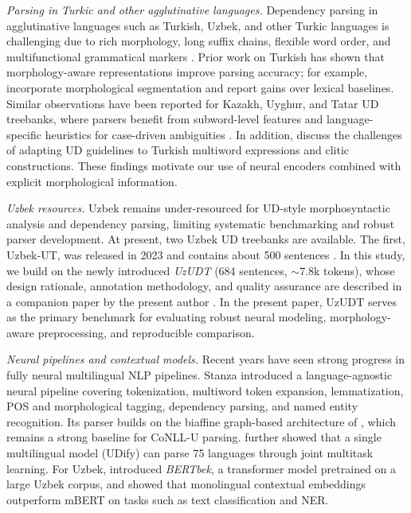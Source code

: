 \documentclass[runningheads]{llncs}
\begin{document}
\noindent\textit{Parsing in Turkic and other agglutinative languages.}
Dependency parsing in agglutinative languages such as Turkish, Uzbek, and other Turkic languages is challenging due to rich morphology, long suffix chains, flexible word order, and multifunctional grammatical markers \cite{MURZINTCEV2026100195}. Prior work on Turkish has shown that morphology-aware representations improve parsing accuracy; for example, \cite{eryigit-etal-2008-dependency} incorporate morphological segmentation and report gains over lexical baselines. Similar observations have been reported for Kazakh, Uyghur, and Tatar UD treebanks, where parsers benefit from subword-level features and language-specific heuristics for case-driven ambiguities \cite{Marsan_undated-hp}. In addition, \cite{noauthor_2018-qq} discuss the challenges of adapting UD guidelines to Turkish multiword expressions and clitic constructions. These findings motivate our use of neural encoders combined with explicit morphological information.

\noindent\textit{Uzbek resources.}
Uzbek remains under-resourced for UD-style morphosyntactic analysis and dependency parsing, limiting systematic benchmarking and robust parser development. At present, two Uzbek UD treebanks are available. The first, Uzbek-UT, was released in 2023 and contains about 500 sentences \cite{akhundjanova-talamo-2025-universal}. In this study, we build on the newly introduced \emph{UzUDT} (684 sentences, ${\sim}$7.8k tokens), whose design rationale, annotation methodology, and quality assurance are described in a companion paper by the present author \cite{matlatipov2025goldudt}. In the present paper, UzUDT serves as the primary benchmark for evaluating robust neural modeling, morphology-aware preprocessing, and reproducible comparison.

\noindent\textit{Neural pipelines and contextual models.}
Recent years have seen strong progress in fully neural multilingual NLP pipelines. Stanza \cite{Qi2020-zr} introduced a language-agnostic neural pipeline covering tokenization, multiword token expansion, lemmatization, POS and morphological tagging, dependency parsing, and named entity recognition. Its parser builds on the biaffine graph-based architecture of \cite{DBLP:conf/iclr/DozatM17}, which remains a strong baseline for CoNLL-U parsing. \cite{kondratyuk-straka-2019-75} further showed that a single multilingual model (UDify) can parse 75 languages through joint multitask learning. For Uzbek, \cite{kuriyozov-etal-2024-bertbek} introduced \textit{BERTbek}, a transformer model pretrained on a large Uzbek corpus, and showed that monolingual contextual embeddings outperform mBERT on tasks such as text classification and NER.
\end{document}
